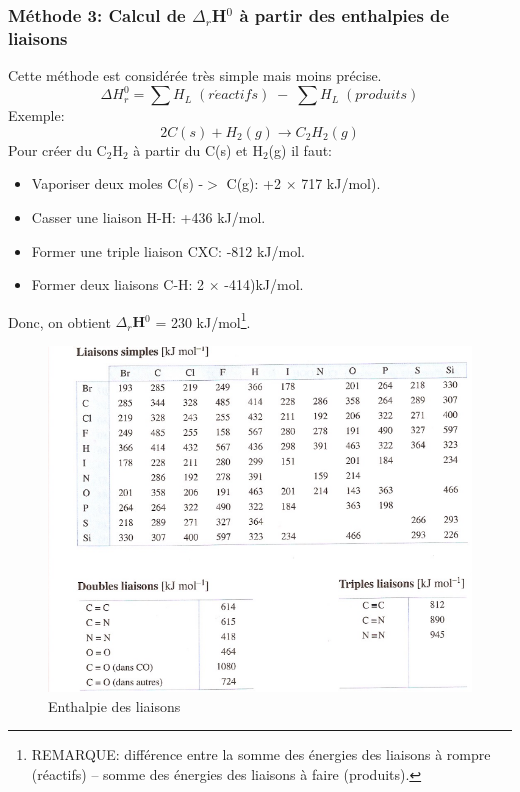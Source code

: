 \documentclass[10pt,a4paper]{book}
\newcommand{\x}{$\times$ }
\begin{document}
\subsubsection{Méthode 3: Calcul de $\Delta_r$H$^0$ à partir des enthalpies de liaisons}

Cette méthode est considérée très simple mais moins précise. 
\begin{displaymath}
\Delta H^0_r = \sum H_L \; (r\acute{e}actifs) \; - \; \sum H_L \; (produits)
\end{displaymath}
Exemple:
\begin{displaymath}
2C(s) + H_2(g) \longrightarrow C_2H_2(g)
\end{displaymath}
Pour créer du C$_2$H$_2$ à partir du C(s) et H$_2$(g) il faut:
\begin{itemize}
\item Vaporiser deux moles C(s) -$>$ C(g): +2 \x 717 kJ/mol).
\item Casser une liaison H-H: +436 kJ/mol.
\item Former une triple liaison CXC: -812 kJ/mol.
\item Former deux liaisons C-H: 2 \x -414)kJ/mol.
\end{itemize}
Donc, on obtient \textbf{$\Delta_r$H$^0$} = 230 kJ/mol\footnote{REMARQUE: différence entre la somme des énergies des liaisons à rompre (réactifs) – somme des énergies des liaisons à faire (produits).}.
\begin{figure}[h!]
\begin{center}
\includegraphics[scale=0.75]{./assets/enthalpy_links.png}
\caption{Enthalpie des liaisons}
\label{fig:enthalpy_links}
\end{center}
\end{figure}
\newpage
\end{document}
